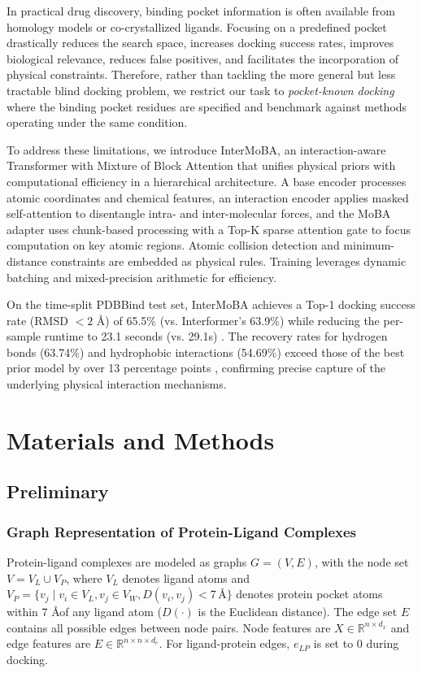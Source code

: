 \documentclass[11pt,a4paper]{article}
\theoremstyle{plain}
\theoremstyle{definition}
\begin{document}
In practical drug discovery, binding pocket information is often available from homology models or co-crystallized ligands. Focusing on a predefined pocket drastically reduces the search space, increases docking success rates, improves biological relevance, reduces false positives, and facilitates the incorporation of physical constraints. Therefore, rather than tackling the more general but less tractable blind docking problem, we restrict our task to \textit{pocket-known docking} where the binding pocket residues are specified and benchmark against methods operating under the same condition.

To address these limitations, we introduce InterMoBA, an interaction-aware Transformer with Mixture of Block Attention that unifies physical priors with computational efficiency in a hierarchical architecture. A base encoder processes atomic coordinates and chemical features, an interaction encoder applies masked self-attention \cite{lee2018pre} to disentangle intra- and inter-molecular forces, and the MoBA adapter uses chunk-based processing with a Top-K sparse attention gate \cite{lu2025moba} to focus computation on key atomic regions. Atomic collision detection and minimum-distance constraints are embedded as physical rules. Training leverages dynamic batching and mixed-precision arithmetic \cite{micikevicius2017mixed} for efficiency.

On the time-split PDBBind test set, InterMoBA achieves a Top-1 docking success rate (RMSD $< 2$ \AA) of 65.5\% (vs. Interformer's 63.9\%) while reducing the per-sample runtime to 23.1 seconds (vs. 29.1s) \cite{lai2024interformer}. The recovery rates for hydrogen bonds (63.74\%) and hydrophobic interactions (54.69\%) exceed those of the best prior model by over 13 percentage points \cite{jain2024deep}, confirming precise capture of the underlying physical interaction mechanisms.

\section{Materials and Methods}

\subsection{Preliminary}
\subsubsection{Graph Representation of Protein-Ligand Complexes}
Protein-ligand complexes are modeled as graphs $G = (V,E)$, with the node set $V = V_L \cup V_P$, where $V_L$ denotes ligand atoms and $V_P = \{v_j \mid v_i \in V_L, v_j \in V_W, D(v_i,v_j) < 7\,\text{\AA}\}$ denotes protein pocket atoms within 7 \AA of any ligand atom ($D(\cdot)$ is the Euclidean distance). The edge set $E$ contains all possible edges between node pairs. Node features are $X \in \mathbb{R}^{n \times d_x}$ and edge features are $E \in \mathbb{R}^{n \times n \times d_e}$. For ligand-protein edges, $e_{LP}$ is set to 0 during docking.
\end{document}
